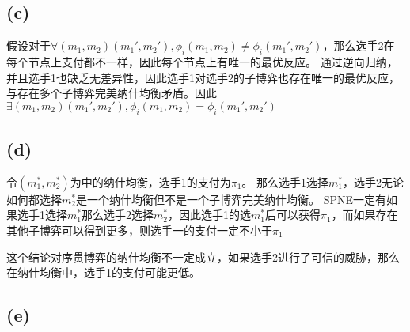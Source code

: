 \documentclass[a4paper,12pt]{ctexart}
\begin{document}
\subsection*{(c)}
假设对于$\forall (m_1,m_2)(m_1',m_2'),\phi_i(m_1,m_2)\neq \phi_i(m_1',m_2')$，那么选手2在每个节点上支付都不一样，因此每个节点上有唯一的最优反应。
通过逆向归纳，并且选手1也缺乏无差异性，因此选手1对选手2的子博弈也存在唯一的最优反应，与存在多个子博弈完美纳什均衡矛盾。因此$\exists  (m_1,m_2)(m_1',m_2'),\phi_i(m_1,m_2)= \phi_i(m_1',m_2')$

\subsection*{(d)}
令$(m_1^*,m_2^*)$为中的纳什均衡，选手1的支付为$\pi_1$。
那么选手1选择$m_1^*$，选手2无论如何都选择$m_{2}^*$是一个纳什均衡但不是一个子博弈完美纳什均衡。
SPNE一定有如果选手1选择$m_1^*$那么选手2选择$m_2^*$，因此选手1的选$m_{1}^*$后可以获得$\pi_1$，而如果存在其他子博弈可以得到更多，则选手一的支付一定不小于$\pi_1$

这个结论对序贯博弈的纳什均衡不一定成立，如果选手2进行了可信的威胁，那么在纳什均衡中，选手1的支付可能更低。
\subsection*{(e)}
\end{document}
